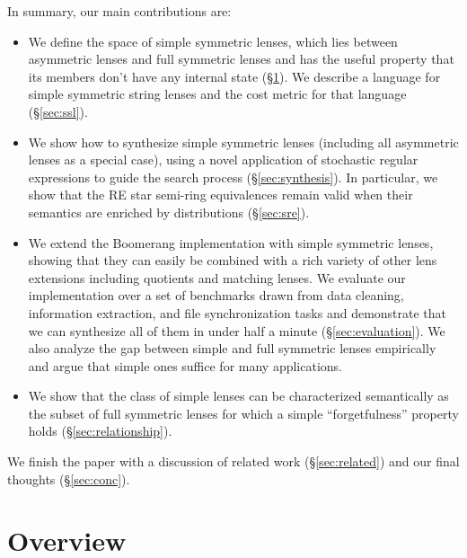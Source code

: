 \documentclass[acmsmall,screen,anonymous]{acmart}
\begin{document}
In summary, our main contributions are:
\begin{itemize}
\item We define the space of simple symmetric lenses, which lies between
  asymmetric lenses and full symmetric lenses and has the useful property that
  its members don't have any internal state (\S\ref{sec:overview}). We describe
  a language for simple symmetric string lenses and the cost metric for that
  language (\S\ref{sec:ssl}).
\item We show how to synthesize simple symmetric lenses (including all
  asymmetric lenses as a special case), using a novel application of stochastic
  regular expressions to guide the search process (\S\ref{sec:synthesis}). In
  particular, we show that the RE star semi-ring equivalences remain valid when
  their semantics are enriched by distributions (\S\ref{sec:sre}).
\item We extend the Boomerang implementation with simple symmetric lenses,
  showing that they can easily be combined with a rich variety of other lens
  extensions including quotients and matching lenses. We evaluate our
  implementation over a set of benchmarks drawn from data cleaning, information
  extraction, and file synchronization tasks and demonstrate that we can
  synthesize all of them in under half a minute (\S\ref{sec:evaluation}).
%
  We also analyze the gap between simple and full symmetric lenses
  empirically and argue that simple ones suffice for many applications.
\item We show that the class of simple lenses can be characterized semantically
  as the subset of full symmetric lenses for which a simple ``forgetfulness''
  property holds (\S\ref{sec:relationship}).
\end{itemize}
We finish the paper with a discussion of related work (\S\ref{sec:related}) and
our final thoughts (\S\ref{sec:conc}).


\noindent


\section{Overview}
\label{sec:overview}
\end{document}
